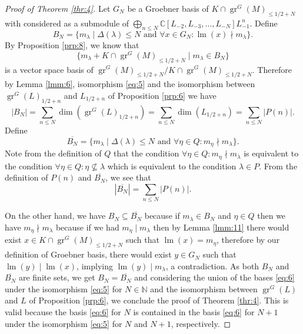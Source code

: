 \documentclass[12pt,a4paper]{article}
\DeclareMathOperator{\gr}{gr}
\DeclareMathOperator{\lm}{lm}
\begin{document}
\begin{proof}[Proof of Theorem \ref{thr:4}]
  Let $G_N$ be a Groebner basis of $K\cap \gr^G(M)_{\le 1/2+N}$ with considered as a submodule of $\bigoplus_{n\le N}\mathbb{C}[L_{-2},L_{-3},\dots, L_{-N}]L_{-1}^n$.
  Define
  \begin{equation*}
    B_N=\{m_\lambda\mid \Delta(\lambda)\le N\text{ and }\forall x\in G_N:\lm(x)\nmid m_\lambda\}.
  \end{equation*}
  By Proposition \ref{prp:8}, we know that
  \begin{equation}
    \label{eq:6}
    \{m_\lambda+K\cap \gr^G(M)_{\le 1/2+N}\mid m_\lambda\in B_N\}
  \end{equation}
is a vector space basis of $\gr^G(M)_{\le 1/2+N}/K\cap \gr^G(M)_{\le 1/2+N}$.
  Therefore by Lemma \ref{lmm:6}, isomorphism \eqref{eq:5} and the isomorphism between $\gr^G(L)_{1/2+n}$ and $L_{1/2+n}$ of Proposition \ref{prp:6} we have
  \begin{equation*}
    |B_N|=\sum_{n\le N}\dim(\gr^G(L)_{1/2+n})=\sum_{n\le N}\dim(L_{1/2+n})=\sum_{n\le N}|P(n)|.
  \end{equation*}
  Define
  \begin{equation*}
    \overline{B_N}=\{m_\lambda\mid \Delta(\lambda)\le N \text{ and } \forall \eta\in Q: m_\eta\nmid m_\lambda\}.
  \end{equation*}
  Note from the definition of $Q$ that the condition $\forall \eta\in Q:m_\eta\nmid m_\lambda$ is equivalent to the condition $\forall \eta\in Q:\eta\nsubseteq \lambda$ which is equivalent to the condition $\lambda\in P$.
  From the definition of $P(n)$ and $\overline{B_N}$, we see that
  \begin{equation*}
    |\overline{B_N}|=\sum_{n\le N}|P(n)|.
  \end{equation*}
  
  On the other hand, we have $B_N\subseteq \overline{B_N}$ because if $m_\lambda \in B_N$ and $\eta\in Q$ then we have $m_\eta\nmid m_\lambda$ because if we had $m_\eta\mid m_\lambda$ then by Lemma \ref{lmm:11} there would exist $x\in K\cap \gr^G(M)_{\le 1/2+N}$ such that $\lm(x)=m_\eta$, therefore by our definition of Groebner basis, there would exist $y\in G_N$ such that $\lm(y)\mid \lm(x)$, implying $\lm(y)\mid m_\lambda$, a contradiction.
  As both $B_N$ and $\overline{B_N}$ are finite sets, we get $B_N=\overline{B_N}$ and considering the union of the bases \eqref{eq:6} under the isomorphism \eqref{eq:5} for $N\in \mathbb{N}$ and the isomorphism between $\gr^G(L)$ and $L$ of Proposition \ref{prp:6}, we conclude the proof of Theorem \ref{thr:4}.
  This is valid because the basis \eqref{eq:6} for $N$ is contained in the basis \eqref{eq:6} for $N+1$ under the isomorphism \eqref{eq:5} for $N$ and $N+1$, respectively.
\end{proof}
\end{document}
